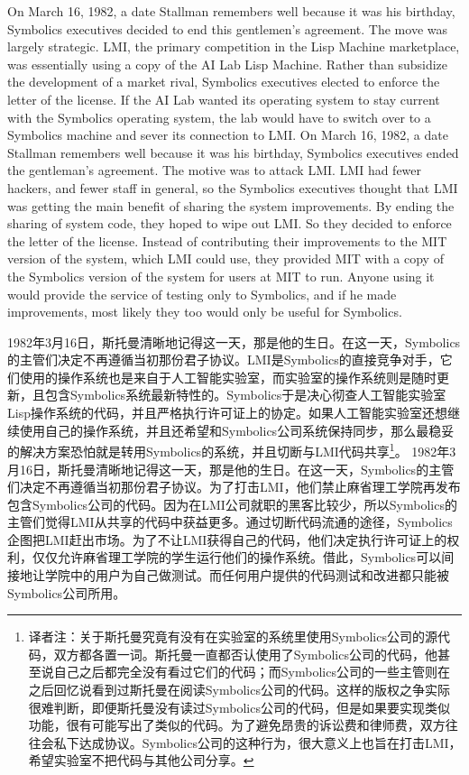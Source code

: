 \ifdefined\eng
\ifdefined\vone
On March 16, 1982, a date Stallman remembers well because it was his birthday, Symbolics executives decided to end this gentlemen's agreement. The move was largely strategic. LMI, the primary competition in the Lisp Machine marketplace, was essentially using a copy of the AI Lab Lisp Machine. Rather than subsidize the development of a market rival, Symbolics executives elected to enforce the letter of the license. If the AI Lab wanted its operating system to stay current with the Symbolics operating system, the lab would have to switch over to a Symbolics machine and sever its connection to LMI.
\fi
\ifdefined\vtwo
On March 16, 1982, a date Stallman remembers well because it was his birthday, Symbolics executives ended the gentleman's agreement. The motive was to attack LMI. LMI had fewer hackers, and fewer staff in general, so the Symbolics executives thought that LMI was getting the main benefit of sharing the system improvements.  By ending the sharing of system code, they hoped to wipe out LMI.  So they decided to enforce the letter of the license.  Instead of contributing their improvements to the MIT version of the system, which LMI could use, they provided MIT with a copy of the Symbolics version of the system for users at MIT to run.  Anyone using it would provide the service of testing only to Symbolics, and if he made improvements, most likely they too would only be useful for Symbolics.
\fi
\fi

\ifdefined\chs
\ifdefined\vone
1982年3月16日，斯托曼清晰地记得这一天，那是他的生日。在这一天，Symbolics的主管们决定不再遵循当初那份君子协议。LMI是Symbolics的直接竞争对手，它们使用的操作系统也是来自于人工智能实验室，而实验室的操作系统则是随时更新，且包含Symbolics系统最新特性的。Symbolics于是决心彻查人工智能实验室Lisp操作系统的代码，并且严格执行许可证上的协定。如果人工智能实验室还想继续使用自己的操作系统，并且还希望和Symbolics公司系统保持同步，那么最稳妥的解决方案恐怕就是转用Symbolics的系统，并且切断与LMI代码共享\footnote{译者注：关于斯托曼究竟有没有在实验室的系统里使用Symbolics公司的源代码，双方都各置一词。斯托曼一直都否认使用了Symbolics公司的代码，他甚至说自己之后都完全没有看过它们的代码；而Symbolics公司的一些主管则在之后回忆说看到过斯托曼在阅读Symbolics公司的代码。这样的版权之争实际很难判断，即便斯托曼没有读过Symbolics公司的代码，但是如果要实现类似功能，很有可能写出了类似的代码。为了避免昂贵的诉讼费和律师费，双方往往会私下达成协议。Symbolics公司的这种行为，很大意义上也旨在打击LMI，希望实验室不把代码与其他公司分享。}。
\fi
\ifdefined\vtwo
1982年3月16日，斯托曼清晰地记得这一天，那是他的生日。在这一天，Symbolics的主管们决定不再遵循当初那份君子协议。为了打击LMI，他们禁止麻省理工学院再发布包含Symbolics公司的代码。因为在LMI公司就职的黑客比较少，所以Symbolics的主管们觉得LMI从共享的代码中获益更多。通过切断代码流通的途径，Symbolics企图把LMI赶出市场。为了不让LMI获得自己的代码，他们决定执行许可证上的权利，仅仅允许麻省理工学院的学生运行他们的操作系统。借此，Symbolics可以间接地让学院中的用户为自己做测试。而任何用户提供的代码测试和改进都只能被Symbolics公司所用。
\fi
\fi

